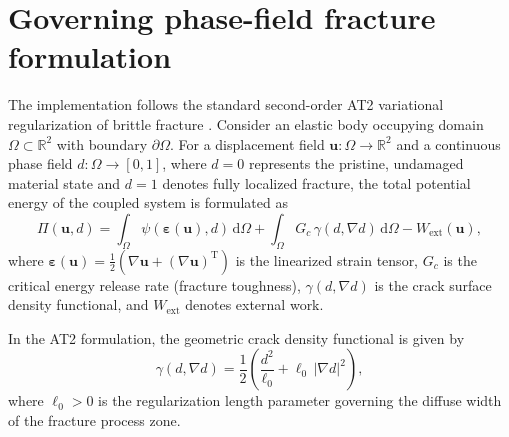\section{Governing phase-field fracture formulation}
The implementation follows the standard second-order AT2 variational regularization of brittle fracture \citep{Msekh2015,Molnar2017,Pandey2025,Diddige2025}. Consider an elastic body occupying domain $\Omega \subset \mathbb{R}^2$ with boundary $\partial \Omega$. For a displacement field $\mathbf{u}: \Omega \to \mathbb{R}^2$ and a continuous phase field $d: \Omega \to [0, 1]$, where $d = 0$ represents the pristine, undamaged material state and $d = 1$ denotes fully localized fracture, the total potential energy of the coupled system is formulated as
\begin{equation}
\label{eq:total_potential}
\Pi(\mathbf{u}, d) = \int_\Omega \psi(\boldsymbol\varepsilon(\mathbf{u}), d)\,\mathrm{d}\Omega + \int_\Omega G_c\,\gamma(d, \nabla d)\,\mathrm{d}\Omega - W_{\mathrm{ext}}(\mathbf{u}),
\end{equation}
where $\boldsymbol\varepsilon(\mathbf{u}) = \frac{1}{2}\left(\nabla \mathbf{u} + (\nabla \mathbf{u})^\mathrm{T}\right)$ is the linearized strain tensor, $G_c$ is the critical energy release rate (fracture toughness), $\gamma(d, \nabla d)$ is the crack surface density functional, and $W_{\mathrm{ext}}$ denotes external work.

In the AT2 formulation, the geometric crack density functional is given by
\begin{equation}
\label{eq:crack_density}
\gamma(d, \nabla d) = \frac{1}{2}\left(\frac{d^2}{\ell_0} + \ell_0\,\lvert\nabla d\rvert^2\right),
\end{equation}
where $\ell_0 > 0$ is the regularization length parameter governing the diffuse width of the fracture process zone.

